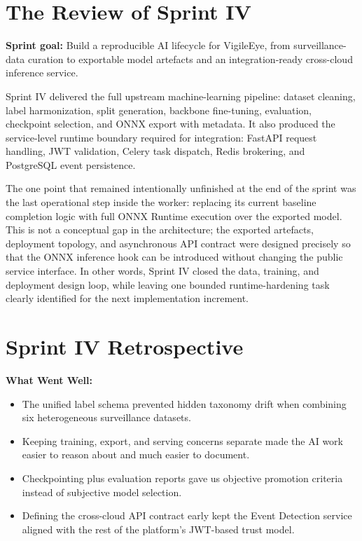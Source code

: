 \documentclass[12pt,a4paper,oneside]{report}
\begin{document}
\section{The Review of Sprint IV}
\label{sec:s4_review}

\hspace{0.8cm}\textbf{Sprint goal:} Build a reproducible AI lifecycle for VigileEye, from surveillance-data curation to exportable model artefacts and an integration-ready cross-cloud inference service.

\hspace{0.8cm}Sprint IV delivered the full upstream machine-learning pipeline: dataset cleaning, label harmonization, split generation, backbone fine-tuning, evaluation, checkpoint selection, and ONNX export with metadata. It also produced the service-level runtime boundary required for integration: FastAPI request handling, JWT validation, Celery task dispatch, Redis brokering, and PostgreSQL event persistence.

\hspace{0.8cm}The one point that remained intentionally unfinished at the end of the sprint was the last operational step inside the worker: replacing its current baseline completion logic with full ONNX Runtime execution over the exported model. This is not a conceptual gap in the architecture; the exported artefacts, deployment topology, and asynchronous API contract were designed precisely so that the ONNX inference hook can be introduced without changing the public service interface. In other words, Sprint IV closed the data, training, and deployment design loop, while leaving one bounded runtime-hardening task clearly identified for the next implementation increment.

\section{Sprint IV Retrospective}
\label{sec:s4_retrospective}

\textbf{What Went Well:}
\begin{itemize}
  \item The unified label schema prevented hidden taxonomy drift when combining six heterogeneous surveillance datasets.
  \item Keeping training, export, and serving concerns separate made the AI work easier to reason about and much easier to document.
  \item Checkpointing plus evaluation reports gave us objective promotion criteria instead of subjective model selection.
  \item Defining the cross-cloud API contract early kept the Event Detection service aligned with the rest of the platform's JWT-based trust model.
\end{itemize}
\end{document}
